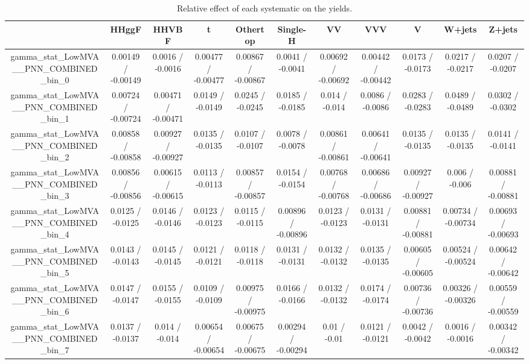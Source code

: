 \documentclass[10pt]{article}
\begin{document}
\begin{table}[htbp]
\begin{center}
\begin{tabular}{|c|c|c|c|c|c|c|c|c|c|c|}
\hline 
      & HHggF      & HHVBF      & t      & Othertop      & Single-H      & VV      & VVV      & V      & W+jets      & Z+jets \\ 
\hline 
  gamma_stat_LowMVA__PNN_COMBINED_bin_0 & 0.00149 / -0.00149 & 0.0016 / -0.0016 & 0.00477 / -0.00477 & 0.00867 / -0.00867 & 0.0041 / -0.0041 & 0.00692 / -0.00692 & 0.00442 / -0.00442 & 0.0173 / -0.0173 & 0.0217 / -0.0217 & 0.0207 / -0.0207 \\ 
  gamma_stat_LowMVA__PNN_COMBINED_bin_1 & 0.00724 / -0.00724 & 0.00471 / -0.00471 & 0.0149 / -0.0149 & 0.0245 / -0.0245 & 0.0185 / -0.0185 & 0.014 / -0.014 & 0.0086 / -0.0086 & 0.0283 / -0.0283 & 0.0489 / -0.0489 & 0.0302 / -0.0302 \\ 
  gamma_stat_LowMVA__PNN_COMBINED_bin_2 & 0.00858 / -0.00858 & 0.00927 / -0.00927 & 0.0135 / -0.0135 & 0.0107 / -0.0107 & 0.0078 / -0.0078 & 0.00861 / -0.00861 & 0.00641 / -0.00641 & 0.0135 / -0.0135 & 0.0135 / -0.0135 & 0.0141 / -0.0141 \\ 
  gamma_stat_LowMVA__PNN_COMBINED_bin_3 & 0.00856 / -0.00856 & 0.00615 / -0.00615 & 0.0113 / -0.0113 & 0.00857 / -0.00857 & 0.0154 / -0.0154 & 0.00768 / -0.00768 & 0.00686 / -0.00686 & 0.00927 / -0.00927 & 0.006 / -0.006 & 0.00881 / -0.00881 \\ 
  gamma_stat_LowMVA__PNN_COMBINED_bin_4 & 0.0125 / -0.0125 & 0.0146 / -0.0146 & 0.0123 / -0.0123 & 0.0115 / -0.0115 & 0.00896 / -0.00896 & 0.0123 / -0.0123 & 0.0131 / -0.0131 & 0.00881 / -0.00881 & 0.00734 / -0.00734 & 0.00693 / -0.00693 \\ 
  gamma_stat_LowMVA__PNN_COMBINED_bin_5 & 0.0143 / -0.0143 & 0.0145 / -0.0145 & 0.0121 / -0.0121 & 0.0118 / -0.0118 & 0.0131 / -0.0131 & 0.0132 / -0.0132 & 0.0135 / -0.0135 & 0.00605 / -0.00605 & 0.00524 / -0.00524 & 0.00642 / -0.00642 \\ 
  gamma_stat_LowMVA__PNN_COMBINED_bin_6 & 0.0147 / -0.0147 & 0.0155 / -0.0155 & 0.0109 / -0.0109 & 0.00975 / -0.00975 & 0.0166 / -0.0166 & 0.0132 / -0.0132 & 0.0174 / -0.0174 & 0.00736 / -0.00736 & 0.00326 / -0.00326 & 0.00559 / -0.00559 \\ 
  gamma_stat_LowMVA__PNN_COMBINED_bin_7 & 0.0137 / -0.0137 & 0.014 / -0.014 & 0.00654 / -0.00654 & 0.00675 / -0.00675 & 0.00294 / -0.00294 & 0.01 / -0.01 & 0.0121 / -0.0121 & 0.0042 / -0.0042 & 0.0016 / -0.0016 & 0.00342 / -0.00342 \\ 
\hline 
\end{tabular} 
\caption{Relative effect of each systematic on the yields.} 
\end{center} 
\end{table} 
\end{document}

